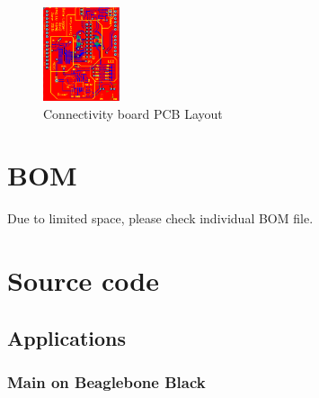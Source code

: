 \begin{appendices}
            \begin{figure}[H]
            \centering
            \includegraphics[width=0.2\textwidth]{funcBrd.png}
            \caption{\label{fig:con_brd}Connectivity board PCB Layout}
            \end{figure}

    \section{BOM}
    Due to limited space, please check individual BOM file.

    \section{Source code}
        \subsection{Applications}
            \label{source:applications}
            \subsubsection{Main on Beaglebone Black}
                 

\end{appendices}





